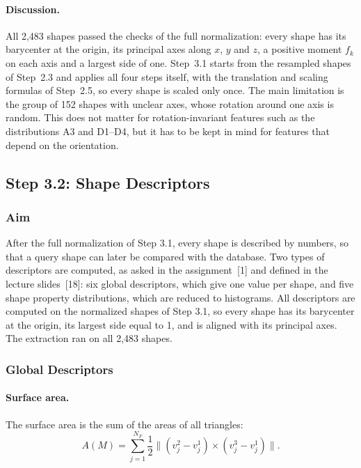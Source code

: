 \documentclass[10pt,a4paper]{article}
\begin{document}
\paragraph{Discussion.}
All 2,483 shapes passed the checks of the full normalization: every shape has its barycenter at the origin, its principal axes
along $x$, $y$ and $z$, a positive moment $f_k$ on each axis and a largest side of one. Step~3.1 starts from the resampled
shapes of Step~2.3 and applies all four steps itself, with the translation and scaling formulas of Step~2.5, so every shape is
scaled only once. The main limitation is the group of 152 shapes with unclear axes, whose rotation around one axis is random. This does not matter for rotation-invariant features such as the
distributions A3 and D1--D4, but it has to be kept in mind for features that depend on the orientation.

\subsection{Step 3.2: Shape Descriptors}
\label{sec:descriptors}

\subsubsection{Aim}

After the full normalization of Step 3.1, every shape is described by numbers, so that a query shape can later be compared with
the database. Two types of descriptors are computed, as asked in the assignment~[1] and defined in the lecture slides~[18]: six
global descriptors, which give one value per shape, and five shape property distributions, which are reduced to histograms. All
descriptors are computed on the normalized shapes of Step 3.1, so every shape has its barycenter at the origin, its largest side
equal to 1, and is aligned with its principal axes. The extraction ran on all 2,483 shapes.

\subsubsection{Global Descriptors}

\paragraph{Surface area.}
The surface area is the sum of the areas of all triangles:
\begin{equation}
A(M) = \sum_{j=1}^{N_F} \frac12\big\lVert (v_j^2-v_j^1)\times(v_j^3-v_j^1)\big\rVert .
\label{eq:s32_surface_area}
\end{equation}
\end{document}
